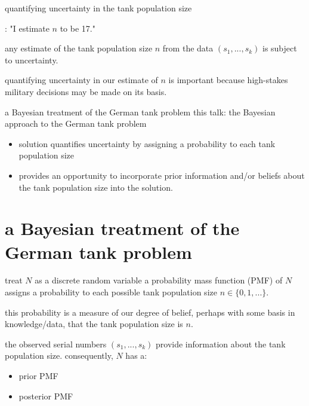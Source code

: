 \documentclass[10pt]{beamer}
\newcommand{\data}{$(s_1, ..., s_k)$\xspace}
\begin{document}
\begin{frame}[t]{quantifying uncertainty in the tank population size}

: "I estimate $n$ to be 17."

\pause 
{}

\pause
 any estimate of the tank population size $n$ from the data \data is subject to uncertainty.

\pause 
quantifying uncertainty in our estimate of $n$ is important because high-stakes military decisions may be made on its basis.

\end{frame}

\begin{frame}[t]{a Bayesian treatment of the German tank problem}
	\alert{this talk}: the Bayesian approach to the German tank problem 
	\begin{itemize}
		\item solution quantifies uncertainty by assigning a probability to each tank population size
		\pause 
		\item provides an opportunity to incorporate prior information and/or beliefs about the tank population size into the solution.
	\end{itemize}
\end{frame}

\section{a Bayesian treatment of the German tank problem}

\begin{frame}[t]{treat $N$ as a discrete random variable}
a probability mass function (PMF) of $N$ assigns a probability to each possible tank population size $n\in\{0,1,...\}$. 

\pause 

 this probability is a measure of our degree of belief, perhaps with some basis in knowledge/data, that the tank population size is $n$. 

\pause 

the observed serial numbers \data provide information about the tank population size. consequently, $N$ has a:
\begin{itemize}
	\item prior PMF
	\item posterior PMF
\end{itemize}
\end{frame}
\end{document}
